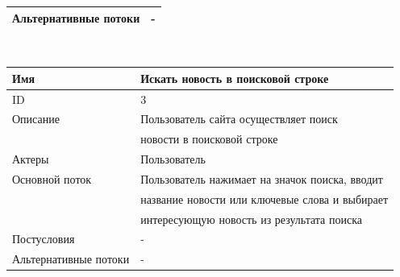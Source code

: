 \begin{center}
\begin{tabular}{|l|l|}
        \hline
        Альтернативные потоки & -                                              \\
        \hline
    \end{tabular}\\
    \vspace{0.5cm}
    \begin{tabular}{|l|l|}
        \hline
        Имя                   & Искать новость в поисковой строке              \\
        \hline
        ID                    & 3                                              \\
        \hline
        Описание              & Пользователь сайта осуществляет поиск          \\
        & новости в поисковой строке                     \\
        \hline
        Актеры                & Пользователь                                   \\
        \hline
        Основной поток        & Пользователь нажимает на значок поиска, вводит \\
        & название новости или ключевые слова и выбирает \\
        & интересующую новость из результата поиска      \\
        \hline
        Постусловия           & -                                              \\
        \hline
        Альтернативные потоки & -                                              \\
        \hline
    \end{tabular}
\end{center}

